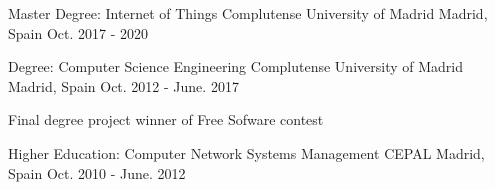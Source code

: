 

\begin{cventries}

  \cventry
    {Master Degree: Internet of Things}
    {Complutense University of Madrid} %
    {Madrid, Spain} %
    {Oct. 2017 - 2020} %
    {
    }

  \cventry
    {Degree: Computer Science Engineering}
    {Complutense University of Madrid} %
    {Madrid, Spain} %
    {Oct. 2012 - June. 2017} %
    {
      \begin{cvitems} %
        \item {Final degree project winner of Free Sofware contest}
      \end{cvitems}
    }

  \cventry
    {Higher Education: Computer Network Systems Management }
    {CEPAL} %
    {Madrid, Spain} %
    {Oct. 2010 - June. 2012} %
    {
    }

\end{cventries}
